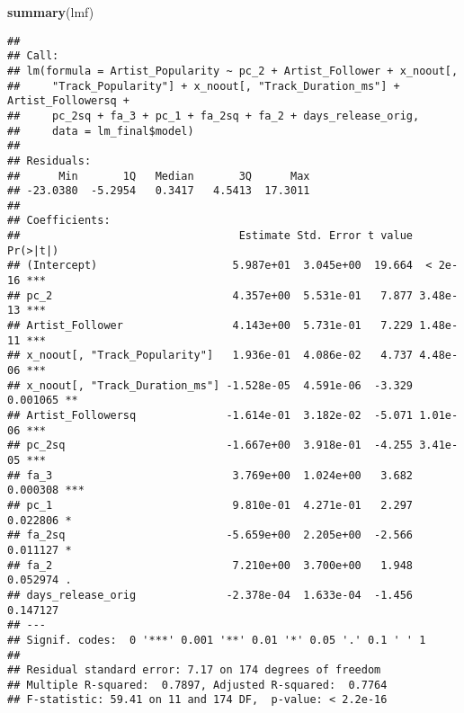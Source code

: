 \documentclass[
]{article}
\newenvironment{Shaded}{\begin{snugshade}}{\end{snugshade}}
\newcommand{\KeywordTok}[1]{\textcolor[rgb]{0.13,0.29,0.53}{\textbf{#1}}}
\newcommand{\NormalTok}[1]{#1}
\begin{document}
\begin{Shaded}
\begin{Highlighting}[]
\KeywordTok{summary}\NormalTok{(lmf)}
\end{Highlighting}
\end{Shaded}

\begin{verbatim}
## 
## Call:
## lm(formula = Artist_Popularity ~ pc_2 + Artist_Follower + x_noout[, 
##     "Track_Popularity"] + x_noout[, "Track_Duration_ms"] + Artist_Followersq + 
##     pc_2sq + fa_3 + pc_1 + fa_2sq + fa_2 + days_release_orig, 
##     data = lm_final$model)
## 
## Residuals:
##      Min       1Q   Median       3Q      Max 
## -23.0380  -5.2954   0.3417   4.5413  17.3011 
## 
## Coefficients:
##                                  Estimate Std. Error t value Pr(>|t|)    
## (Intercept)                     5.987e+01  3.045e+00  19.664  < 2e-16 ***
## pc_2                            4.357e+00  5.531e-01   7.877 3.48e-13 ***
## Artist_Follower                 4.143e+00  5.731e-01   7.229 1.48e-11 ***
## x_noout[, "Track_Popularity"]   1.936e-01  4.086e-02   4.737 4.48e-06 ***
## x_noout[, "Track_Duration_ms"] -1.528e-05  4.591e-06  -3.329 0.001065 ** 
## Artist_Followersq              -1.614e-01  3.182e-02  -5.071 1.01e-06 ***
## pc_2sq                         -1.667e+00  3.918e-01  -4.255 3.41e-05 ***
## fa_3                            3.769e+00  1.024e+00   3.682 0.000308 ***
## pc_1                            9.810e-01  4.271e-01   2.297 0.022806 *  
## fa_2sq                         -5.659e+00  2.205e+00  -2.566 0.011127 *  
## fa_2                            7.210e+00  3.700e+00   1.948 0.052974 .  
## days_release_orig              -2.378e-04  1.633e-04  -1.456 0.147127    
## ---
## Signif. codes:  0 '***' 0.001 '**' 0.01 '*' 0.05 '.' 0.1 ' ' 1
## 
## Residual standard error: 7.17 on 174 degrees of freedom
## Multiple R-squared:  0.7897, Adjusted R-squared:  0.7764 
## F-statistic: 59.41 on 11 and 174 DF,  p-value: < 2.2e-16
\end{verbatim}
\end{document}
